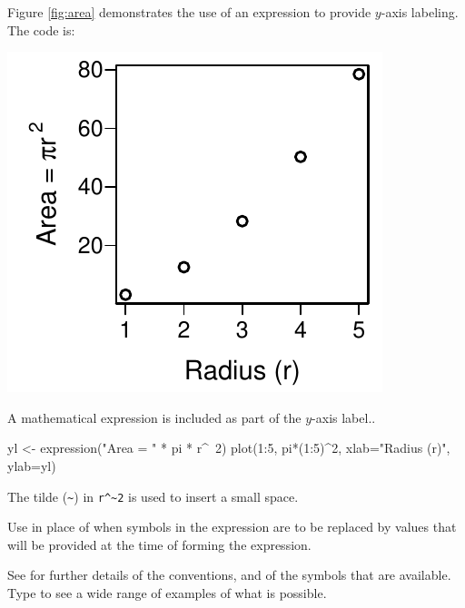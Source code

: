 Figure \ref{fig:area} demonstrates the use of an expression to
provide $y$-axis labeling.  The code is:
\begin{marginfigure}
\begin{Schunk}


\centerline{\includegraphics[width=\textwidth]{figs/07-plot-expr-1} }

\end{Schunk}
\caption{A mathematical expression is included as part of the
  $y$-axis label.\label{fig:area}.}
\end{marginfigure}
\begin{Schunk}
\begin{Sinput}
yl <- expression("Area = " * pi * r^~2)
plot(1:5, pi*(1:5)^2, xlab="Radius (r)", ylab=yl)
\end{Sinput}
\end{Schunk}
\noindent The tilde (\verb+~+) in \verb+r^~2+ is used to insert a small space.

Use  in place of  when
symbols in the expression are to be replaced by values that
will be provided at the time of forming the expression.

See  for further details of the conventions,
and of the symbols that are available.  Type 
to see a wide range of examples of what is possible.

